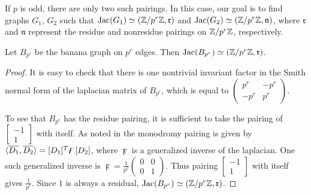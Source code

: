 \documentclass{amsart}
\begin{document}
If $p$ is odd, there are only two such pairings. In this case, our
goal is to find graphs $G_1$, $G_2$ such that $\operatorname{Jac}(G_1) \simeq
(\mathbb{Z}/p^r\mathbb{Z}, \mathfrak{r})$ and $\operatorname{Jac}(G_2) \simeq (\mathbb{Z}/p^r\mathbb{Z},
\mathfrak{n})$, where $\mathfrak{r}$ and $\mathfrak{n}$ represent the
residue and nonresidue pairings on $\mathbb{Z}/p^r\mathbb{Z}$, respectively. 

\begin{prop}
  \label{prop:banana_residue}
  Let $B_{p^r}$ be the banana graph on $p^r$ edges. Then
  $\operatorname{Jac}(B_{p^r}) \simeq (\mathbb{Z}/p^r\mathbb{Z}, \mathfrak{r})$.
\end{prop}

\begin{proof}

It is easy to check that there is one nontrivial invariant factor in the Smith normal form of the laplacian matrix of $B_{p^r}$, which is equal to $\left(\begin{array}{cc}p^{r}&-p^r\\-p^r&p^r\end{array}\right)$.

 To see that $B_{p^r}$ has the residue pairing, it is sufficient to take the pairing of $\left[\begin{array}{c}-1\\1\end{array}\right]$ with itself. As noted in %
the monodromy pairing is given by $\langle \overline{D_1}, \overline{D_{2}} \rangle=[D_1]^{T}\digamma[D_2]$, where $\digamma$ is a generalized inverse of the laplacian. One such generalized inverse is $\digamma=\frac{1}{p^{r}}\left(\begin{array}{cc}0&0\\0&1\end{array}\right)$. Thus pairing $\left[\begin{array}{c}-1\\1\end{array}\right]$ with itself gives $\frac{1}{p^{r}}$. Since $1$ is always a residual, $\operatorname{Jac}(B_{p^r}) \simeq (\mathbb{Z}/p^r\mathbb{Z}, \mathfrak{r})$.

\end{proof}
\end{document}
